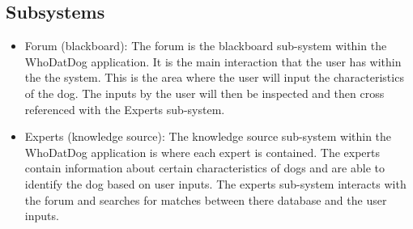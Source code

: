 \documentclass[]{article}
\begin{document}
\subsection{Subsystems}
\label{sub:subsystems}
\begin{itemize}
	\item Forum (blackboard): The forum is the blackboard sub-system within the WhoDatDog application. It is the main interaction that the user has within the the system. This is the area where the user will input the characteristics of the dog. The inputs by the user will then be inspected and then cross referenced with the Experts sub-system.
	\item Experts (knowledge source): The knowledge source sub-system within the WhoDatDog application is where each expert is contained. The experts contain information about certain characteristics of dogs and are able to identify the dog based on user inputs. The experts sub-system interacts with the forum and searches for matches between there database and the user inputs.
	
\end{itemize}

\end{document}
